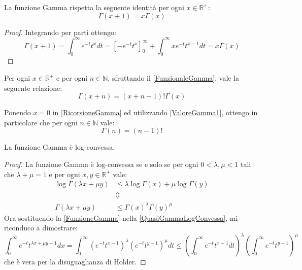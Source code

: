 \begin{lemma}\label{FunzionaleGamma}
	La funzione Gamma rispetta la seguente identità per ogni $x\in\mathbb{R^+}$:
	\begin{equation*}
		\Gamma(x+1)=x\Gamma(x)
	\end{equation*}
\end{lemma}
\begin{proof}
	Integrando per parti ottengo:
	\begin{equation*} 
		\Gamma(x+1)=\int_0^{\infty}{e^{-t}t^xdt}=\left[-e^{-t}t^x\right]_0^{\infty}+\int_0^{\infty}xe^{-t}t^{x-1}dt=x\Gamma(x)
	\end{equation*}
\end{proof}

\begin{remark} \label{RicorsioneGamma}
	Per ogni $x\in\mathbb{R^+}$ e per ogni $n\in\mathbb{N}$, sfruttando il \cref{FunzionaleGamma}, vale la seguente relazione:
	\begin{equation}
		\Gamma(x+n)=(x+n-1)!\Gamma(x)
	\end{equation}
\end{remark}

\begin{remark} \label{ValoreGammaNaturali}
	Ponendo $x=0$ in \cref{RicorsioneGamma} ed utilizzando \cref{ValoreGamma1}, ottengo in particolare che per ogni $n\in\mathbb{N}$ vale:
	\begin{equation}
		\Gamma(n)=(n-1)!
	\end{equation}
\end{remark}


\begin{lemma}\label{GammaLogConvessa}
	La funzione Gamma è log-convessa.
\end{lemma}
\begin{proof}
	La funzione Gamma è log-convessa se e solo se per ogni $0<\lambda,\mu < 1$ tali che $\lambda+\mu=1$
	e per ogni $x,y \in \mathbb{R}^+$ vale:
	\begin{equation}\label{QuasiGammaLogConvessa}
	\begin{split} 
		\log \Gamma(\lambda x+\mu y )  & \le \lambda \log \Gamma(x) + \mu\log \Gamma( y )\\
		& \Updownarrow  \\
		\Gamma(\lambda x+\mu y ) & \le  \Gamma(x)^{\lambda}\Gamma( y )^{\mu}
	\end{split}\end{equation}
	Ora sostituendo la \cref{FunzioneGamma} nella \cref{QuasiGammaLogConvessa}, mi riconduco a dimostrare:
	\begin{equation*}
		\int_0^{\infty}{e^{-t}t^{\lambda x+\mu y-1}dx}=\int_0^{\infty}{(e^{-t}t^{x-1})^\lambda (e^{-t}t^{y-1})^{\mu}dt} \le 
		\left(\int_0^{\infty}{e^{-t}t^{x-1}dt}\right)^\lambda \left(\int_0^{\infty}{e^{-t}t^{y-1}}\right)^{\mu}
	\end{equation*}
	che è vera per la disuguaglianza di Holder.
\end{proof}
 
